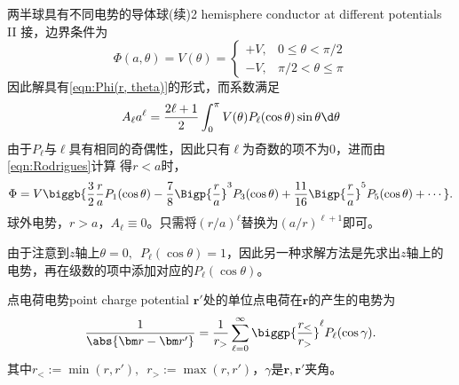 \begin{example}{两半球具有不同电势的导体球(续)}{2 hemisphere conductor at different potentials II}
    接，边界条件为
    \[
        \Phi(a,\theta)=V(\theta)=
        \begin{cases}
            +V,&0\leqslant\theta<\pi/2\\
            -V,&\pi/2<\theta\leqslant\pi
        \end{cases}
    \]
    因此解具有\eqref{eqn:Phi(r, theta)}的形式，而系数满足
    \[
        A_\ell a^\ell=\frac{2\ell+1}2\int_0^\pi V(\theta)P_\ell(\cos\theta)\sin\theta\d\theta
    \]
    由于$P_\ell$与$\ell$具有相同的奇偶性，因此只有$\ell$为奇数的项不为0，进而由\eqref{eqn:Rodrigues}计算
    得$r<a$时，
    \[
        \Phi=V\biggb{\frac32\frac raP_1(\cos\theta)-\frac78\Bigp{\frac ra}^3P_3(\cos\theta)+\frac{11}{16}\Bigp{\frac ra}^5P_5(\cos\theta)+\cdots}.
    \]
    \tcblower
    球外电势，$r>a$，$A_\ell\equiv 0$。只需将$(r/a)^\ell$替换为$(a/r)^{\ell+1}$即可。
\end{example}
由于注意到$z$轴上$\theta=0,\enspace P_\ell(\cos\theta)=1$，因此另一种求解方法是先求出$z$轴上的电势，再在级数的项中添加对应的$P_\ell(\cos\theta)$。

\begin{example}{点电荷电势}{point charge potential}
    $\bm r'$处的单位点电荷在$\bm r$的产生的电势为
    \begin{equation}
        \label{eqn:1/|r-r'|}
        \frac1{\abs{\bm r-\bm r'}}=\frac1{r_>}\sum_{\ell=0}^\infty\biggp{\frac{r_<}{r_>}}^\ell P_\ell(\cos\gamma).
    \end{equation}
    其中$r_<:=\min(r,r'),\enspace r_>:=\max(r,r')$，$\gamma$是$\bm r,\bm r'$夹角。
\end{example}
    

